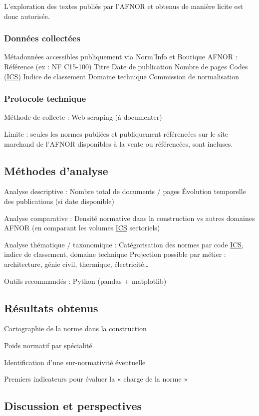 \documentclass[a4paper,12pt]{article}
\begin{document}
L'exploration des textes publiés par l'AFNOR et obtenus de manière licite est donc autorisée.
\subsubsection{Données collectées}
\label{sec:org14faeb4}
Métadonnées accessibles publiquement via Norm’Info et Boutique AFNOR :
    Référence (ex : NF C15-100)
    Titre
    Date de publication
    Nombre de pages
    Codes  (\protect\hyperlink{gls-11}{\label{gls-11-use-1}ICS})
    Indice de classement
    Domaine technique
    Commission de normalisation
\subsubsection{Protocole technique}
\label{sec:org1ba17d8}
Méthode de collecte : Web scraping (à documenter)

Limite : seules les normes publiées et publiquement référencées sur le site marchand de l'AFNOR disponibles à la vente ou référencées, sont incluses.
\subsection{Méthodes d'analyse}
\label{sec:org6b0167b}
Analyse descriptive :
    Nombre total de documents / pages
    Évolution temporelle des publications (si date disponible)

Analyse comparative :
    Densité normative dans la construction vs autres domaines AFNOR (en comparant les volumes \protect\hyperlink{gls-11}{\label{gls-11-use-2}ICS} sectoriels)

Analyse thématique / taxonomique :
    Catégorisation des normes par code \protect\hyperlink{gls-11}{\label{gls-11-use-3}ICS}, indice de classement, domaine technique
    Projection possible par métier : architecture, génie civil, thermique, électricité…

Outils recommandés : Python (pandas + matplotlib)
\subsection{Résultats obtenus}
\label{sec:org04d0af2}
Cartographie de la norme dans la construction

Poids normatif par spécialité

Identification d’une sur-normativité éventuelle

Premiers indicateurs pour évaluer la « charge de la norme »
\subsection{Discussion et perspectives}
\label{sec:org858df37}
\clearpage
\end{document}
